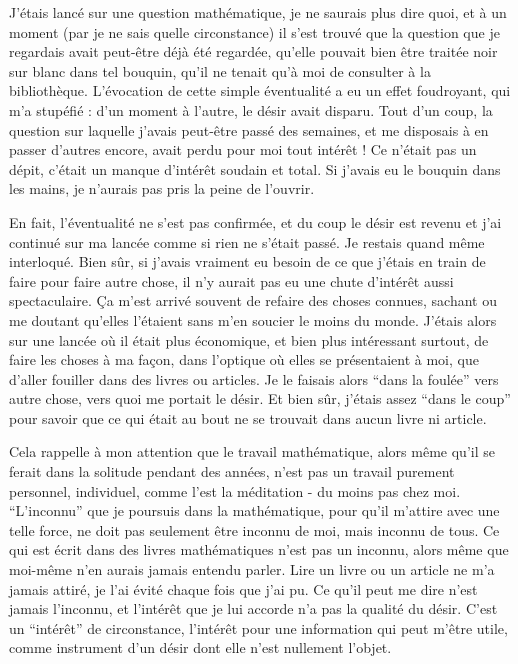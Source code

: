 J'étais lancé sur une question mathématique, je ne saurais plus dire quoi, et à un moment (par je ne sais quelle circonstance) il s'est trouvé que la question que je regardais avait peut-être déjà été regardée, qu'elle pouvait bien être traitée noir sur blanc dans tel bouquin, qu'il ne tenait qu'à moi de consulter à la bibliothèque. L'évocation de cette simple éventualité a eu un effet foudroyant, qui m'a stupéfié : d'un moment à l'autre, le désir avait disparu. Tout d'un coup, la question sur laquelle j'avais peut-être passé des semaines, et me disposais à en passer d'autres encore, avait perdu pour moi tout intérêt ! Ce n'était pas un dépit, c'était un manque d'intérêt soudain et total. Si j'avais eu le bouquin dans les mains, je n'aurais pas pris la peine de l'ouvrir.

En fait, l'éventualité ne s'est pas confirmée, et du coup le désir est revenu et j'ai continué sur ma lancée comme si rien ne s'était passé. Je restais quand même interloqué. Bien sûr, si j'avais vraiment eu besoin de ce que j'étais en train de faire pour faire autre chose, il n'y aurait pas eu une chute d'intérêt aussi spectaculaire. Ça m'est arrivé souvent de refaire des choses connues, sachant ou me doutant qu'elles l'étaient sans m'en soucier le moins du monde. J'étais alors sur une lancée où il était plus économique, et bien plus intéressant surtout, de faire les choses à ma façon, dans l'optique où elles se présentaient à moi, que d'aller fouiller dans des livres ou articles. Je le faisais alors ``dans la foulée'' vers autre chose, vers quoi me portait le désir. Et bien sûr, j'étais assez ``dans le coup'' pour savoir que ce qui était au bout ne se trouvait dans aucun livre ni article.

Cela rappelle à mon attention que le travail mathématique, alors même qu'il se ferait dans la solitude pendant des années, n'est pas un travail purement personnel, individuel, comme l'est la méditation - du moins pas chez moi. ``L'inconnu'' que je poursuis dans la mathématique, pour qu'il m'attire avec une telle force, ne doit pas seulement être inconnu de moi, mais inconnu de tous. Ce qui est écrit dans des livres mathématiques n'est pas un inconnu, alors même que moi-même n'en aurais jamais entendu parler. Lire un livre ou un article ne m'a jamais attiré, je l'ai évité chaque fois que j'ai pu. Ce qu'il peut me dire n'est jamais l'inconnu, et l'intérêt que je lui accorde n'a pas la qualité du désir. C'est un ``intérêt'' de circonstance, l'intérêt pour une information qui peut m'être utile, comme instrument d'un désir dont elle n'est nullement l'objet.

